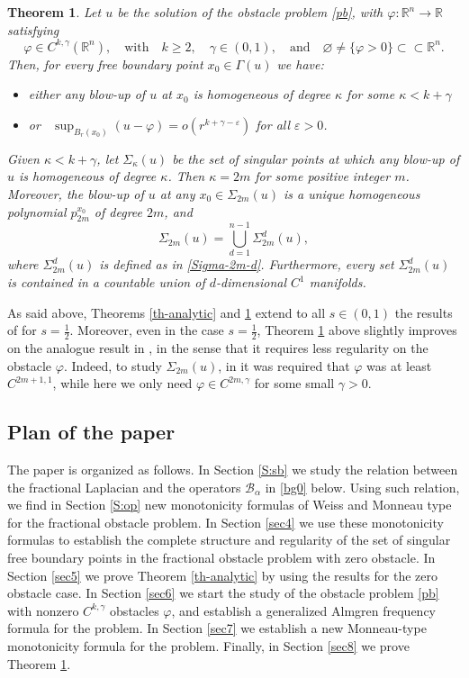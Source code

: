 \documentclass[11pt]{amsart}
\theoremstyle{plain}
\newtheorem{thrm}{Theorem}[section]
\numberwithin{equation}{section}
\begin{document}
\begin{thrm}\label{th-main}
Let $u$ be the solution of the obstacle problem \eqref{pb}, with $\varphi:{\mathbb R}^n\to{\mathbb R}$ satisfying
\begin{equation}\label{obstacle}
\varphi\in C^{k,\gamma}({\mathbb R}^n),\quad \textrm{with}\quad k\geq2,\quad \gamma\in(0,1),\quad \textrm{and}\quad\varnothing\neq \{\varphi>0\}\subset\subset{\mathbb R}^n.
\end{equation}
Then, for every free boundary point $x_0\in \Gamma(u)$ we have:
\begin{itemize}
\item[(a)] either any blow-up of $u$ at $x_0$ is homogeneous of degree $\kappa$ for some $\kappa<k+\gamma$
\item[(b)] or \ $\sup_{B_r(x_0)}(u-\varphi)=o(r^{k+\gamma-\varepsilon})$ for all $\varepsilon>0$.
\end{itemize}
Given $\kappa<k+\gamma$, let $\Sigma_\kappa(u)$ be the set of singular points at which any blow-up of $u$ is homogeneous of degree $\kappa$.
Then $\kappa=2m$ for some positive integer $m$.
Moreover, the blow-up of $u$ at any $x_0\in \Sigma_{2m}(u)$ is a {unique} homogeneous polynomial $p_{2m}^{x_0}$ of degree $2m$, and
\[\Sigma_{2m}(u)=\bigcup_{d=1}^{n-1}\Sigma_{2m}^d(u),\]
where $\Sigma_{2m}^d(u)$ is defined as in \eqref{Sigma-2m-d}.
Furthermore, every set $\Sigma_{2m}^d(u)$ is contained in a countable union of $d$-dimensional $C^1$ manifolds.
\end{thrm}

As said above, Theorems \ref{th-analytic} and \ref{th-main} extend to all $s\in(0,1)$ the results of \cite{GP} for $s=\frac12$.
Moreover, even in the case $s=\frac12$, Theorem \ref{th-main} above slightly improves on the analogue result in \cite{GP}, in the sense that it requires less regularity on the obstacle $\varphi$.
Indeed, to study $\Sigma_{2m}(u)$, in \cite{GP} it was required that $\varphi$ was at least $C^{2m+1,1}$, while here we only need $\varphi\in C^{2m,\gamma}$ for some small $\gamma>0$.

\subsection{Plan of the paper}

The paper is organized as follows.
In Section \ref{S:sb} we study the relation between the fractional Laplacian and the  operators $\mathcal B_\alpha$ in  \eqref{bg0} below.
Using such relation, we find in Section \ref{S:op} new monotonicity formulas of Weiss and Monneau type for the fractional obstacle problem.
In Section \ref{sec4} we use these monotonicity formulas to establish the complete structure and regularity of the set of singular free boundary points in the fractional obstacle problem with zero obstacle.
In Section \ref{sec5} we prove Theorem \ref{th-analytic} by using the results for the zero obstacle case.
In Section \ref{sec6} we start the study of the obstacle problem \eqref{pb} with nonzero $C^{k,\gamma}$ obstacles $\varphi$, and establish a generalized Almgren frequency formula for the problem.
In Section \ref{sec7} we establish a new Monneau-type monotonicity formula for the problem. Finally, in Section \ref{sec8} we prove Theorem \ref{th-main}.
\end{document}

